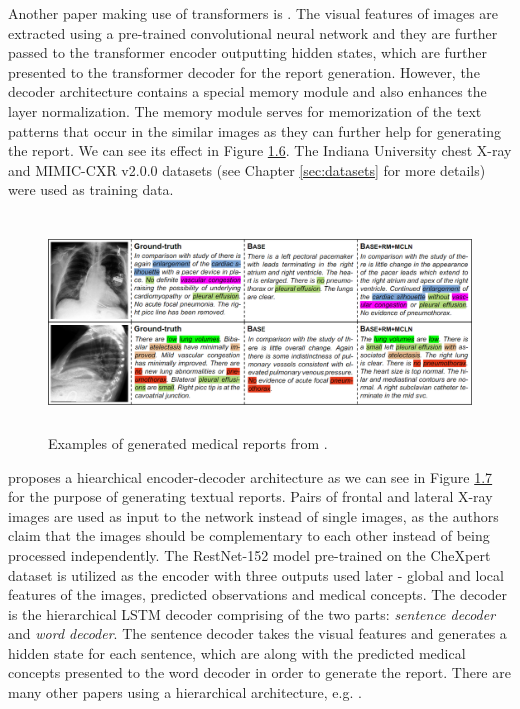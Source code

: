 Another paper making use of transformers is \citet{chen2020generating}. The visual features of images are extracted using a pre-trained convolutional neural network and they are further passed to the transformer encoder outputting hidden states, which are further presented to the transformer decoder for the report generation. However, the decoder architecture contains a special memory module and also enhances the layer normalization. The memory module serves for memorization of the text patterns that occur in the similar images as they can further help for generating the report. We can see its effect in Figure \hyperref[fig06:ZhihongExample]{1.6}. The Indiana University chest X-ray and MIMIC-CXR v2.0.0 datasets (see Chapter \ref{sec:datasets} for more details) were used as training data.\\

\begin{figure}[h]\centering
\includegraphics[width=145mm, height=57mm]{../img/ZhihongExample}
\caption{Examples of generated medical reports from \citet{chen2020generating}.}
\label{fig06:ZhihongExample}
\end{figure}

\citet{yuan2019automatic} proposes a hiearchical encoder-decoder architecture as we can see in Figure \hyperref[fig07:YuanExample]{1.7} for the purpose of generating textual reports. Pairs of frontal and lateral X-ray images are used as input to the network instead of single images, as the authors claim that the images should be complementary to each other instead of being processed independently. The RestNet-152 model pre-trained on the CheXpert\citep{irvin2019chexpert} dataset is utilized as the encoder with three outputs used later - global and local features of the images, predicted observations and medical concepts. The decoder is the hierarchical LSTM decoder comprising of the two parts: \textit{sentence decoder} and \textit{word decoder}. The sentence decoder takes the visual features and generates a hidden state for each sentence, which are along with the predicted medical concepts presented to the word decoder in order to generate the report. There are many other papers using a hierarchical architecture, e.g. \citet{huang2019multi}. \\

